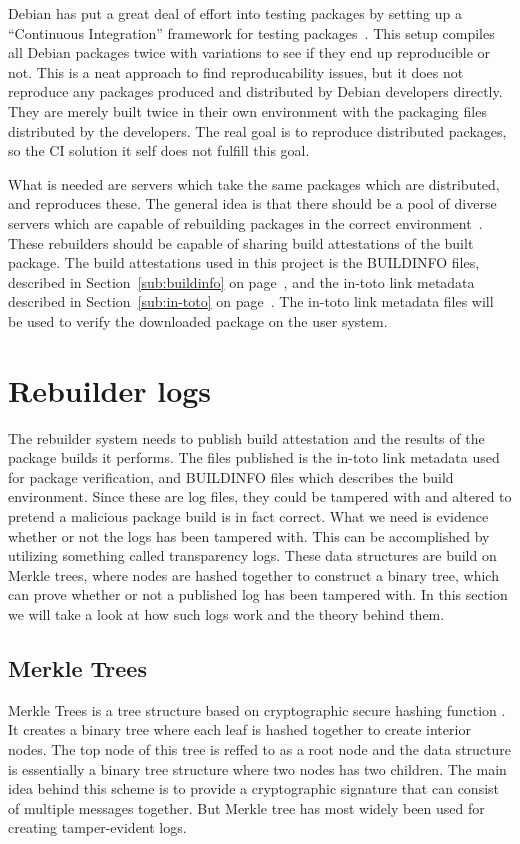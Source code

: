 \documentclass[../Main/thesis.tex]{subfiles}
\begin{document}
Debian has put a great deal of effort into testing packages by setting up a
``Continuous Integration'' framework for testing packages~\cite{debian-ci}.
This setup compiles all Debian packages twice with variations to see if they end
up reproducible or not. This is a neat approach to find reproducability issues,
but it does not reproduce any packages produced and distributed by Debian
developers directly. They are merely built twice in their own environment with
the packaging files distributed by the developers. The real goal is to reproduce
distributed packages, so the CI solution it self does not fulfill this goal.

What is needed are servers which take the same packages which are distributed,
and reproduces these. The general idea is that there should be a pool of diverse
servers which are capable of rebuilding packages in the correct
environment~\cite{reproducible-builds-sharing}. These rebuilders should be
capable of sharing build attestations of the built package. The build
attestations used in this project is the BUILDINFO files, described in
Section~\ref{sub:buildinfo} on page~\pageref{sub:buildinfo}, and the in-toto
link metadata described in Section~\ref{sub:in-toto} on
page~\pageref{sub:in-toto}. The in-toto link metadata files will be used to
verify the downloaded package on the user system.

\section{Rebuilder logs}%
\label{sec:rebuilder_logs}
The rebuilder system needs to publish build attestation and the results of the
package builds it performs. The files published is the in-toto link metadata
used for package verification, and BUILDINFO files which describes the build
environment. Since these are log files, they could be tampered with and altered
to pretend a malicious package build is in fact correct. What we need is
evidence whether or not the logs has been tampered with. This can be
accomplished by utilizing something called transparency logs. These data
structures are build on Merkle trees, where nodes are hashed together to
construct a binary tree, which can prove whether or not a published log has been
tampered with. In this section we will take a look at how such logs work and the
theory behind them.

\subsection{Merkle Trees}%
\label{sec:merkle_trees}
Merkle Trees is a tree structure based on cryptographic secure hashing function
\cite{ralph-c.-merkle-1998}. It creates a binary tree where each leaf is hashed
together to create interior nodes. The top node of this tree is reffed to as a root
node and the data structure is essentially a binary tree structure where two
nodes has two children. The main idea behind this scheme is to provide a
cryptographic signature that can consist of multiple messages together. But
Merkle tree has most widely been used for creating tamper-evident logs.
\end{document}
